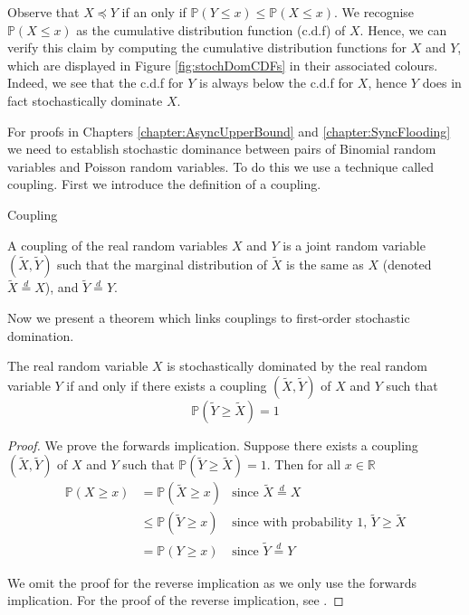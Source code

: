 Observe that $X \preceq Y$ if an only if $\mathbb{P}(Y \leq x) \leq \mathbb{P}(X \leq x)$. We recognise $\mathbb{P}(X \leq x)$ as the cumulative distribution function (c.d.f) of $X$. Hence, we can verify this claim by computing the cumulative  distribution functions for $X$ and $Y$, which are displayed in Figure \ref{fig:stochDomCDFs} in their associated colours. Indeed, we see that the c.d.f for $Y$ is always below the c.d.f for $X$, hence $Y$ does in fact stochastically dominate $X$.

For proofs in Chapters \ref{chapter:AsyncUpperBound} and \ref{chapter:SyncFlooding} we need to establish stochastic dominance between pairs of Binomial random variables and Poisson random variables. To do this we use a technique called coupling. First we introduce the definition of a coupling.

\begin{definition} 
	Coupling

	\noindent
	A coupling of the real random variables $X$ and $Y$ is a joint random variable $(\tilde{X}, \tilde{Y})$ such that the marginal distribution of $\tilde{X}$ is the same as $X$ (denoted $\tilde{X} \stackrel{d}{=} X$), and $\tilde{Y} \stackrel{d}{=} Y$.
\end{definition}


Now we present a theorem which links couplings to first-order stochastic domination.

\begin{theorem}\label{theorem:couplingDomination}
	The real random variable $X$ is stochastically dominated by the real random variable $Y$ if and only if there exists a coupling $(\tilde{X}, \tilde{Y})$ of $X$ and $Y$ such that
	$$
		\mathbb{P}(\tilde{Y} \geq \tilde{X}) = 1
	$$
\end{theorem}

\begin{proof}
	We prove the forwards implication. Suppose there exists a coupling $(\tilde{X}, \tilde{Y})$ of $X$ and $Y$ such that $\mathbb{P}(\tilde{Y} \geq \tilde{X}) = 1$. Then for all $x \in \mathbb{R}$
	\begin{align*}
		\mathbb{P}(X \geq x) &= \mathbb{P}(\tilde{X} \geq x) & \text{since } \tilde{X} \stackrel{d}{=} X \\
		&\leq \mathbb{P}(\tilde{Y} \geq x) & \text{since with probability 1, } \tilde{Y} \geq \tilde{X} \\
		&= \mathbb{P}(Y \geq x) & \text{since } \tilde{Y} \stackrel{d}{=} Y 
	\end{align*}

	We omit the proof for the reverse implication as we only use the forwards implication. For the proof of the reverse implication, see \cite{coupling}.
\end{proof}

